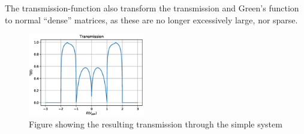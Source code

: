\vspace{\baselineskip}
The transmission-function also transform the transmission and Green's function to normal ``dense'' matrices, as these are no longer excessively large, nor sparse.
\begin{figure}[ht]
	\includegraphics[width=0.45\textwidth]{Figures/BetaTE.eps}
	\caption{Figure showing the resulting transmission through the simple system}\label{Transsimple}
\end{figure}
